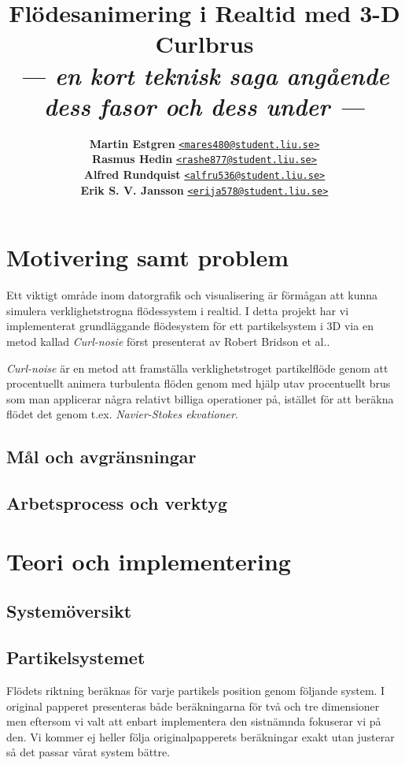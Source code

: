 \documentclass[a4paper]{article}
\date{\vspace{-1.8ex}} %
\title{\vspace{-2.2cm}\textbf{Flödesanimering i Realtid med 3-D Curlbrus}\\
       \Large{\textit{--- en kort teknisk saga angående dess fasor och dess under ---}}}
\author{{\textbf{Martin Estgren}}\;\;\;\;\;\; {\href{mailto:mares480@student.liu.se}{\texttt{<mares480@student.liu.se>}}}\\
        {\textbf{Rasmus Hedin}}\;\;\;\;\;\;\;\; {\href{mailto:rashe877@student.liu.se}{\texttt{<rashe877@student.liu.se>}}}\\
        {\textbf{Alfred Rundquist}}\;\;\; {\href{mailto:alfru536@student.liu.se}{\texttt{<alfru536@student.liu.se>}}}\\
        {\textbf{Erik S. V. Jansson}}\; {\href{mailto:erija578@student.liu.se}{\texttt{<erija578@student.liu.se>}}}}
\begin{document}
    \maketitle

    \section{Motivering samt problem}

    Ett viktigt område inom datorgrafik och visualisering är förmågan att kunna simulera verklighetstrogna flödessystem i realtid. I detta projekt har vi implementerat grundläggande flödesystem för ett partikelsystem i 3D via en metod kallad \textit{Curl-nosie} först presenterat av Robert Bridson et al.\cite{bridson2007curl}.

    \textit{Curl-noise} är en metod att framställa verklighetstroget partikelflöde genom att procentuellt animera turbulenta flöden genom med hjälp utav procentuellt brus som man applicerar några relativt billiga operationer på, istället för att beräkna flödet det genom t.ex. \textit{Navier-Stokes ekvationer}. 

        \subsection{Mål och avgränsningar}

        \subsection{Arbetsprocess och verktyg}

    \section{Teori och implementering}

        \subsection{Systemöversikt}

        \subsection{Partikelsystemet}

    Flödets riktning beräknas för varje partikels position genom följande system. I original papperet presenteras både beräkningarna för två och tre dimensioner men eftersom vi valt att enbart implementera den sistnämnda fokuserar vi på den. Vi kommer ej heller följa originalpapperets beräkningar exakt utan justerar så det passar vårat system bättre.
\end{document}
